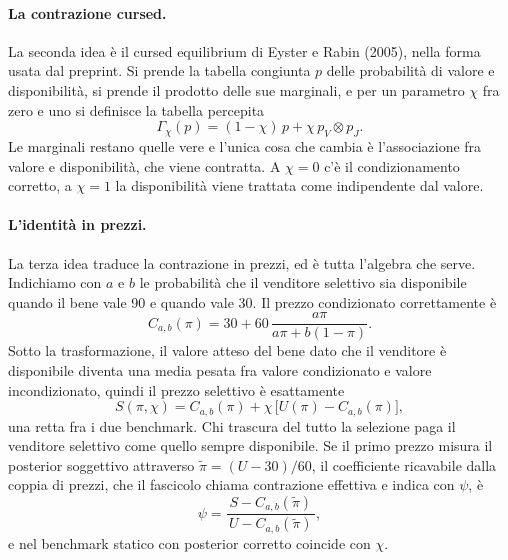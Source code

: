 \documentclass[11pt,a4paper]{article}
\begin{document}
\paragraph{La contrazione cursed.}
La seconda idea \`e il cursed equilibrium di Eyster e Rabin (2005), nella forma usata dal preprint. Si prende la tabella congiunta $p$ delle probabilit\`a di valore e disponibilit\`a, si prende il prodotto delle sue marginali, e per un parametro $\chi$ fra zero e uno si definisce la tabella percepita
\[
\Gamma_{\chi}(p)=(1-\chi)\,p+\chi\,p_{V}\otimes p_{J}.
\]
Le marginali restano quelle vere e l'unica cosa che cambia \`e l'associazione fra valore e disponibilit\`a, che viene contratta. A $\chi=0$ c'\`e il condizionamento corretto, a $\chi=1$ la disponibilit\`a viene trattata come indipendente dal valore.

\paragraph{L'identit\`a in prezzi.}
La terza idea traduce la contrazione in prezzi, ed \`e tutta l'algebra che serve. Indichiamo con $a$ e $b$ le probabilit\`a che il venditore selettivo sia disponibile quando il bene vale 90 e quando vale 30. Il prezzo condizionato correttamente \`e
\[
C_{a,b}(\pi)=30+60\,\frac{a\pi}{a\pi+b(1-\pi)}.
\]
Sotto la trasformazione, il valore atteso del bene dato che il venditore \`e disponibile diventa una media pesata fra valore condizionato e valore incondizionato, quindi il prezzo selettivo \`e esattamente
\[
S(\pi,\chi)=C_{a,b}(\pi)+\chi\,\bigl[U(\pi)-C_{a,b}(\pi)\bigr],
\]
una retta fra i due benchmark. Chi trascura del tutto la selezione paga il venditore selettivo come quello sempre disponibile. Se il primo prezzo misura il posterior soggettivo attraverso $\widetilde{\pi}=(U-30)/60$, il coefficiente ricavabile dalla coppia di prezzi, che il fascicolo chiama contrazione effettiva e indica con $\psi$, \`e
\[
\psi=\frac{S-C_{a,b}(\widetilde{\pi})}{\,U-C_{a,b}(\widetilde{\pi})\,},
\]
e nel benchmark statico con posterior corretto coincide con $\chi$.
\end{document}
